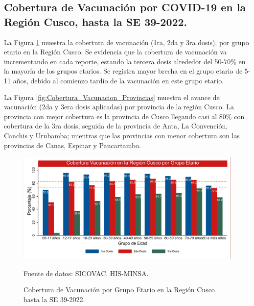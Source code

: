 \documentclass[12pt,a4paper,openany]{book}
\begin{document}
	\subsection*{Cobertura de Vacunación por COVID-19 en la Región Cusco, hasta la SE 39-2022.}
	\noindent La Figura \ref{fig:vacuna_edad} muestra la cobertura de vacunación (1ra, 2da y 3ra dosis), por grupo etario en la Región Cusco. Se evidencia que la cobertura de vacunación va incrementando en cada reporte, estando la tercera dosis alrededor del 50-70$\%$ en la mayoría de los grupos etarios. Se registra mayor brecha en el grupo etario de 5-11 años, debido al comienzo tardío de la vacunación en este grupo etario.
	
	La Figura \ref{fig:Cobertura_Vacunacion_Provincias} muestra el avance de vacunación (2da y 3era dosis aplicadas) por provincia de la región Cusco. La provincia con mejor cobertura es la provincia de Cusco llegando casi al 80$\%$ con cobertura de la 3ra dosis, seguida de la provincia de Anta, La Convención, Canchis y Urubamba; mientras que las provincias con menor cobertura son las provincias de Canas, Espinar y Paucartambo. 
	\begin{figure}[h]
		\caption{Cobertura de Vacunación por Grupo Etario en la Región Cusco hasta la SE 39-2022. }\label{fig:vacuna_edad}
		\begin{center}
			\includegraphics[width=0.85\linewidth]{../figuras/vacunacion_grupo_edad_dosis.pdf}
		\end{center}
		{\footnotesize {Fuente de datos: SICOVAC, HIS-MINSA.}}
	\end{figure}
	\clearpage
	
\end{document}
